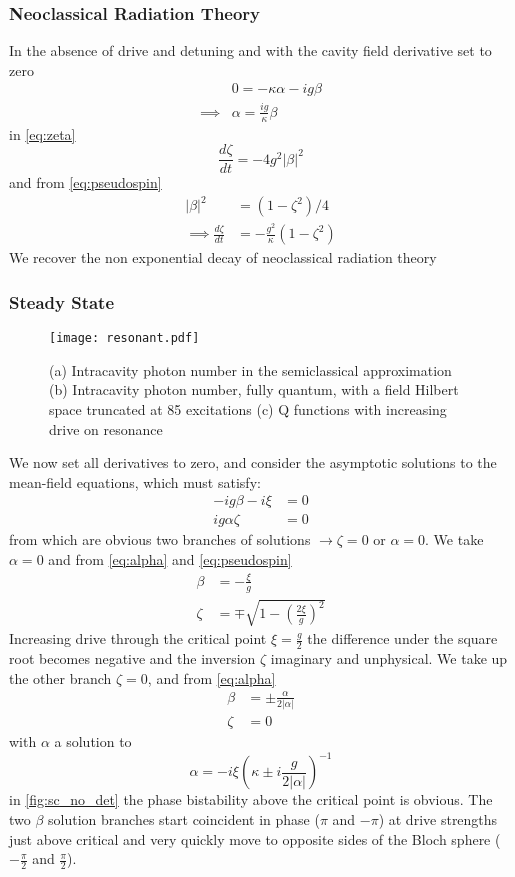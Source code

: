 \subsubsection{Neoclassical Radiation Theory}
In the absence of drive and detuning and with the cavity field derivative set to zero
\begin{align}
  & 0 = -\kappa \alpha - ig \beta \\
  \implies & \alpha = \frac{ig}{\kappa} \beta
\end{align}
in \cref{eq:zeta}
\begin{equation}
  \frac{d \zeta}{dt} = -4 g^2 |\beta|^2
\end{equation}
and from \cref{eq:pseudospin}
\begin{align}
   |\beta|^2 &= (1-\zeta^2)/4 \\
\implies \frac{d \zeta}{dt} &= -\frac{g^2}{\kappa} (1-\zeta^2)
\end{align}
We recover the non exponential decay of neoclassical radiation theory
\subsubsection{Steady State}
\begin{figure*}[!htb]
    \texttt{[image: resonant.pdf]}
    \caption{(a) Intracavity photon number in the semiclassical approximation (b) Intracavity photon number, fully quantum, with a field Hilbert space truncated at 85 excitations (c) Q functions with increasing drive on resonance}
    \label{resonant}
\end{figure*}
We now set all derivatives to zero, and consider the asymptotic solutions to the mean-field equations, which must satisfy:
\begin{align}
  -ig \beta -i \xi &= 0 \\
  ig\alpha \zeta &= 0
\end{align}
from which are obvious two branches of solutions $\rightarrow \zeta = 0$ or $\alpha = 0$. We take $\alpha = 0$ and from \cref{eq:alpha} and \cref{eq:pseudospin}
\begin{align}
  \beta &= -\frac{\xi}{g} \\
  \zeta &= \mp \sqrt{1 - {\left( \frac{2\xi}{g} \right)}^2}
\end{align}
Increasing drive through the critical point $\xi = \frac{g}{2}$ the difference under the square root becomes negative and the inversion $\zeta$ imaginary and unphysical. We take up the other branch $\zeta = 0$, and from \cref{eq:alpha}
\begin{align}
  \beta &= \pm \frac{\alpha}{2|\alpha|} \\
  \zeta &= 0
\end{align}
with $\alpha$ a solution to
\begin{equation}
  \alpha = -i \xi{\left ( \kappa \pm i \frac{g}{2|\alpha|} \right )}^{-1}
  \label{eq:alphacondnotdet}
\end{equation}
in \cref{fig:sc_no_det} the phase bistability above the critical point is obvious. The two $\beta$ solution branches start coincident in phase ($\pi$ and $-\pi$) at drive strengths just above critical and very quickly move to opposite sides of the Bloch sphere ($-\frac{\pi}{2}$ and $\frac{\pi}{2}$).

